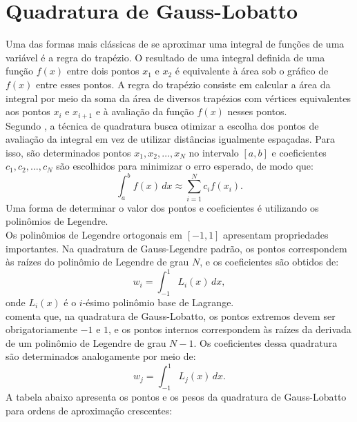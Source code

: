 \chapter{Quadratura de Gauss-Lobatto}

\indent Uma das formas mais clássicas de se aproximar uma integral de funções de uma variável é a regra do trapézio. O resultado de uma integral definida de uma função $f(x)$ entre dois pontos $x_1$ e $x_2$ é equivalente à área sob o gráfico de $f(x)$ entre esses pontos. A regra do trapézio consiste em calcular a área da integral por meio da soma da área de diversos trapézios com vértices equivalentes aos pontos $x_{i}$ e $x_{i+1}$ e à avaliação da função $f(x)$ nesses pontos.\\
\indent Segundo \citet{burden2015numerical}, a técnica de quadratura busca otimizar a escolha dos pontos de avaliação da integral em vez de utilizar distâncias igualmente espaçadas. Para isso, são determinados pontos $x_1, x_2, \dots, x_N$ no intervalo $[a,b]$ e coeficientes $c_1, c_2, \dots, c_N$ são escolhidos para minimizar o erro esperado, de modo que: 
\begin{equation}
  \int_a^b f(x) \, dx \approx \sum_{i=1}^N c_i f(x_i).
\end{equation}
\noindent Uma forma de determinar o valor dos pontos e coeficientes é utilizando os polinômios de Legendre.\\
\indent Os polinômios de Legendre ortogonais em $[-1, 1]$ apresentam propriedades importantes. Na quadratura de Gauss-Legendre padrão, os pontos correspondem às raízes do polinômio de Legendre de grau $N$, e os coeficientes são obtidos de:
\begin{equation}
  w_i = \int_{-1}^1 L_i(x) \, dx,
\end{equation}
\noindent onde $L_i(x)$ é o $i$-ésimo polinômio base de Lagrange.\\
\indent \citet{kopriva2009implementing} comenta que, na quadratura de Gauss-Lobatto, os pontos extremos devem ser obrigatoriamente $-1$ e $1$, e os pontos internos correspondem às raízes da derivada de um polinômio de Legendre de grau $N-1$. Os coeficientes dessa quadratura são determinados analogamente por meio de:
\begin{equation}
  w_j = \int_{-1}^1 L_j(x) \, dx.
\end{equation}
\indent A tabela abaixo apresenta os pontos e os pesos da quadratura de Gauss-Lobatto para ordens de aproximação crescentes:

